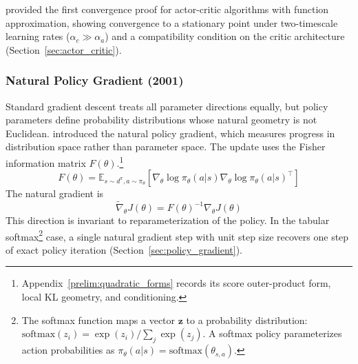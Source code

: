 \citet{konda2000} provided the first convergence proof for actor-critic algorithms with function approximation, showing convergence to a stationary point under two-timescale learning rates ($\alpha_c \gg \alpha_a$) and a compatibility condition on the critic architecture (Section~\ref{sec:actor_critic}).


\subsubsection{Natural Policy Gradient (2001)}

Standard gradient descent treats all parameter directions equally, but policy parameters define probability distributions whose natural geometry is not Euclidean. \citet{Kakade2001} introduced the natural policy gradient, which measures progress in distribution space rather than parameter space. The update uses the Fisher information matrix $F(\theta)$.\footnote{Appendix~\ref{prelim:quadratic_forms} records its score outer-product form, local KL geometry, and conditioning.}
\begin{equation}
F(\theta) = \mathbb{E}_{s \sim d^\pi, a \sim \pi_\theta} \left[ \nabla_\theta \log \pi_\theta(a|s) \nabla_\theta \log \pi_\theta(a|s)^\top \right]
\end{equation}
The natural gradient is
\begin{equation}
\tilde{\nabla}_\theta J(\theta) = F(\theta)^{-1} \nabla_\theta J(\theta)
\end{equation}
This direction is invariant to reparameterization of the policy. In the tabular softmax\footnote{The softmax function maps a vector $\mathbf{z}$ to a probability distribution: $\text{softmax}(z_i) = \exp(z_i)/\sum_j \exp(z_j)$. A softmax policy parameterizes action probabilities as $\pi_\theta(a|s) = \text{softmax}(\theta_{s,a})$.} case, a single natural gradient step with unit step size recovers one step of exact policy iteration (Section~\ref{sec:policy_gradient}).

